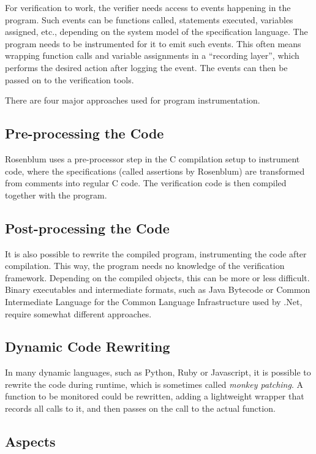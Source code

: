 \documentclass[a4paper,11pt]{kth-mag}
\begin{document}
For verification to work, the verifier needs access to events happening in the
program. Such events can be functions called, statements executed, variables
assigned, etc., depending on the system model of the specification language.
The program needs to be instrumented for it to emit such events. This often
means wrapping function calls and variable assignments in a ``recording
layer'', which performs the desired action after logging the event. The events
can then be passed on to the verification tools.

There are four major approaches used for program instrumentation.


\subsection{Pre-processing the Code}

Rosenblum \cite{rosenblum95practicalassertions} uses a pre-processor step in
the C compilation setup to instrument code, where the specifications (called
assertions by Rosenblum) are transformed from comments into regular C code. The
verification code is then compiled together with the program.


\subsection{Post-processing the Code}

It is also possible to rewrite the compiled program, instrumenting the code
after compilation. This way, the program needs no knowledge of the verification
framework. Depending on the compiled objects, this can be more or less
difficult. Binary executables and intermediate formats, such as Java Bytecode
or Common Intermediate Language for the Common Language Infrastructure used by
.Net, require somewhat different approaches.


\subsection{Dynamic Code Rewriting}

In many dynamic languages, such as Python, Ruby or Javascript, it is possible
to rewrite the code during runtime, which is sometimes called \textit{monkey
patching}. A function to be monitored could be rewritten, adding a lightweight
wrapper that records all calls to it, and then passes on the call to the actual
function.


\subsection{Aspects} \label{section-aspects}
\end{document}
